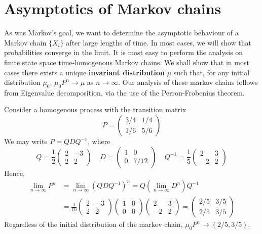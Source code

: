 \section{Asymptotics of Markov chains}

As was Markov's goal, we want to determine the asymptotic behaviour of a Markov chain $\{X_i\}$ after large lengths of time. In most cases, we will show that probabilities converge in the limit. It is most easy to perform the analysis on finite state space time-homogenous Markov chains. We shall show that in most cases there exists a unique {\bf invariant distribution} $\mu$ such that, for any initial distribution $\mu_0$, $\mu_0 P^n \to \mu$ as $n \to \infty$. Our analysis of these markov chains follows from Eigenvalue decomposition, via the use of the Perron-Frobenius theorem.

\begin{example}
    Consider a homogenous process with the transition matrix
    \[ P = \begin{pmatrix} 3/4 & 1/4 \\ 1/6 & 5/6 \end{pmatrix} \]
    We may write $P = QDQ^{-1}$, where
    \[ Q = \frac{1}{2} \begin{pmatrix} 2 & -3 \\ 2 & 2 \end{pmatrix} \ \ \ \ \ D = \begin{pmatrix} 1 & 0 \\ 0 & 7/12 \end{pmatrix} \ \ \ \ \ Q^{-1} = \frac{1}{5} \begin{pmatrix} 2 & 3 \\ -2 & 2 \end{pmatrix} \]
    Hence,
    \begin{align*}
        \lim_{n \to \infty} P^n &= \lim_{n \to \infty} (QDQ^{-1})^n = Q (\lim_{n \to \infty} D^n) Q^{-1}\\
        &= \frac{1}{10} \begin{pmatrix} 2 & -3 \\ 2 & 2 \end{pmatrix} \begin{pmatrix} 1 & 0 \\ 0 & 0 \end{pmatrix} \begin{pmatrix} 2 & 3 \\ -2 & 2 \end{pmatrix} = \begin{pmatrix} 2/5 & 3/5 \\ 2/5 & 3/5 \end{pmatrix}
    \end{align*}
    Regardless of the initial distribution of the markov chain, $\mu_0P^n \to (2/5, 3/5)$.
\end{example}

